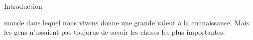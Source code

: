 
\newpage

\begin{center}
\Huge Introduction
\end{center}


 monde dans lequel nous vivons donne une grande valeur à la
 connaissance. Mais les gens n'essaient pas toujorus de savoir les choses les
 plus importantes.




